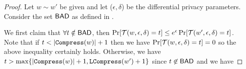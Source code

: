 \begin{remindertheorem}{}
    \dptheorem
\end{remindertheorem}

\begin{proof}
    Let $w\sim w'$ be given and let ($\epsilon,\delta$) be the differential privacy parameters. Consider the set $\mathsf{BAD}$ as defined in .

    We first claim that $\forall t \notin \mathsf{BAD}$, then $\Pr[\mathcal{T}(w,\epsilon,\delta)=t]\leq e^{\epsilon}\Pr[\mathcal{T}(w',\epsilon,\delta)=t]$. Note that if $t < |\mathtt{Compress}(w)|+1$ then we have $\Pr[\mathcal{T}(w,\epsilon,\delta)=t] = 0$ so the above inequality certainly holds. Otherwise, we have $ t > \max\{|\mathtt{Compress}(w)|+1,\mathtt{LCompress}(w')+1\}$ since $t \not\in \mathsf{BAD}$ and we have 


\end{proof}
